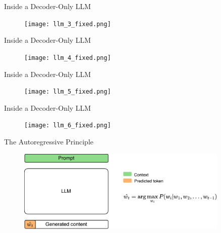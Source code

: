 \documentclass[11pt,aspectratio=169]{beamer}
\begin{document}
\begin{frame}{Inside a Decoder-Only LLM}
    \begin{figure}
        \centering
        \texttt{[image: llm\_3\_fixed.png]}
    \end{figure}
\end{frame}

\begin{frame}{Inside a Decoder-Only LLM}
    \begin{figure}
        \centering
        \texttt{[image: llm\_4\_fixed.png]}
    \end{figure}
\end{frame}

\begin{frame}{Inside a Decoder-Only LLM}
    \begin{figure}
        \centering
        \texttt{[image: llm\_5\_fixed.png]}
    \end{figure}
\end{frame}

\begin{frame}{Inside a Decoder-Only LLM}
    \begin{figure}
        \centering
        \texttt{[image: llm\_6\_fixed.png]}
    \end{figure}
\end{frame}

\begin{frame}{The Autoregressive Principle}
    \begin{figure}
        \centering
        \includegraphics[width=0.9\textwidth]{llm_autoregressive_1.png}
    \end{figure}
    \vspace{1.6cm}
\end{frame}
\end{document}
